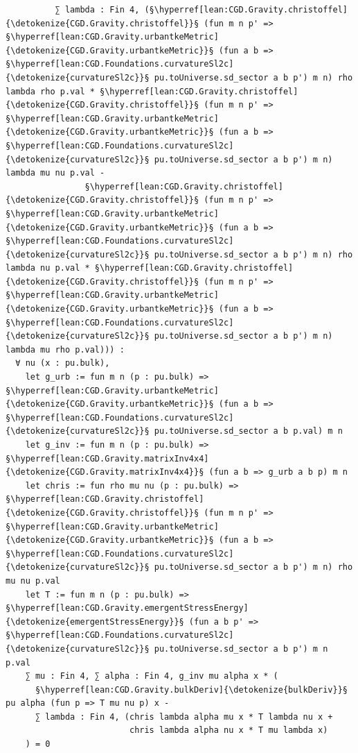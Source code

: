 \begin{verbatim}
          ∑ lambda : Fin 4, (§\hyperref[lean:CGD.Gravity.christoffel]{\detokenize{CGD.Gravity.christoffel}}§ (fun m n p' => §\hyperref[lean:CGD.Gravity.urbantkeMetric]{\detokenize{CGD.Gravity.urbantkeMetric}}§ (fun a b => §\hyperref[lean:CGD.Foundations.curvatureSl2c]{\detokenize{curvatureSl2c}}§ pu.toUniverse.sd_sector a b p') m n) rho lambda rho p.val * §\hyperref[lean:CGD.Gravity.christoffel]{\detokenize{CGD.Gravity.christoffel}}§ (fun m n p' => §\hyperref[lean:CGD.Gravity.urbantkeMetric]{\detokenize{CGD.Gravity.urbantkeMetric}}§ (fun a b => §\hyperref[lean:CGD.Foundations.curvatureSl2c]{\detokenize{curvatureSl2c}}§ pu.toUniverse.sd_sector a b p') m n) lambda mu nu p.val -
                §\hyperref[lean:CGD.Gravity.christoffel]{\detokenize{CGD.Gravity.christoffel}}§ (fun m n p' => §\hyperref[lean:CGD.Gravity.urbantkeMetric]{\detokenize{CGD.Gravity.urbantkeMetric}}§ (fun a b => §\hyperref[lean:CGD.Foundations.curvatureSl2c]{\detokenize{curvatureSl2c}}§ pu.toUniverse.sd_sector a b p') m n) rho lambda nu p.val * §\hyperref[lean:CGD.Gravity.christoffel]{\detokenize{CGD.Gravity.christoffel}}§ (fun m n p' => §\hyperref[lean:CGD.Gravity.urbantkeMetric]{\detokenize{CGD.Gravity.urbantkeMetric}}§ (fun a b => §\hyperref[lean:CGD.Foundations.curvatureSl2c]{\detokenize{curvatureSl2c}}§ pu.toUniverse.sd_sector a b p') m n) lambda mu rho p.val))) :
  ∀ nu (x : pu.bulk),
    let g_urb := fun m n (p : pu.bulk) => §\hyperref[lean:CGD.Gravity.urbantkeMetric]{\detokenize{CGD.Gravity.urbantkeMetric}}§ (fun a b => §\hyperref[lean:CGD.Foundations.curvatureSl2c]{\detokenize{curvatureSl2c}}§ pu.toUniverse.sd_sector a b p.val) m n
    let g_inv := fun m n (p : pu.bulk) => §\hyperref[lean:CGD.Gravity.matrixInv4x4]{\detokenize{CGD.Gravity.matrixInv4x4}}§ (fun a b => g_urb a b p) m n
    let chris := fun rho mu nu (p : pu.bulk) => §\hyperref[lean:CGD.Gravity.christoffel]{\detokenize{CGD.Gravity.christoffel}}§ (fun m n p' => §\hyperref[lean:CGD.Gravity.urbantkeMetric]{\detokenize{CGD.Gravity.urbantkeMetric}}§ (fun a b => §\hyperref[lean:CGD.Foundations.curvatureSl2c]{\detokenize{curvatureSl2c}}§ pu.toUniverse.sd_sector a b p') m n) rho mu nu p.val
    let T := fun m n (p : pu.bulk) => §\hyperref[lean:CGD.Gravity.emergentStressEnergy]{\detokenize{emergentStressEnergy}}§ (fun a b p' => §\hyperref[lean:CGD.Foundations.curvatureSl2c]{\detokenize{curvatureSl2c}}§ pu.toUniverse.sd_sector a b p') m n p.val
    ∑ mu : Fin 4, ∑ alpha : Fin 4, g_inv mu alpha x * (
      §\hyperref[lean:CGD.Gravity.bulkDeriv]{\detokenize{bulkDeriv}}§ pu alpha (fun p => T mu nu p) x -
      ∑ lambda : Fin 4, (chris lambda alpha mu x * T lambda nu x +
                         chris lambda alpha nu x * T mu lambda x)
    ) = 0


\end{verbatim}
